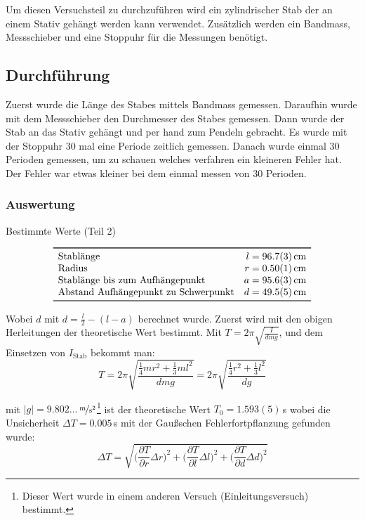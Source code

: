 \documentclass[11pt,a4paper]{article}
\newcommand{\pard}[2]{\frac{\partial #1}{\partial #2}}
\newcommand{\bigp}[1]{\bigg(#1\bigg)}
\begin{document}
Um diesen Versuchsteil zu durchzuführen wird ein zylindrischer Stab der an einem Stativ gehängt werden kann verwendet. Zusätzlich werden ein Bandmass, Messschieber und eine Stoppuhr für die Messungen benötigt. 



\FloatBarrier
\subsection{Durchführung}

Zuerst wurde die Länge des Stabes mittels Bandmass gemessen. Daraufhin wurde mit dem Messschieber den Durchmesser des Stabes gemessen. Dann wurde der Stab an das Stativ gehängt und per hand zum Pendeln gebracht. Es wurde mit der Stoppuhr 30 mal eine Periode zeitlich gemessen. Danach wurde einmal 30 Perioden gemessen, um zu schauen welches verfahren ein kleineren Fehler hat. Der Fehler war etwas kleiner bei dem einmal messen von 30 Perioden.

\subsubsection{Auswertung}

\begin{table}[ht]
\caption{Bestimmte Werte (Teil 2)}
$$
\begin{array}{lr}
	\toprule 
	\textrm{Stablänge} & l = 96.7(3)\,\textrm{cm} \\
	\textrm{Radius} & r = 0.50(1)\,\textrm{cm} \\
	\textrm{Stablänge bis zum Aufhängepunkt} & a = 95.6(3)\,\textrm{cm}\\
	\textrm{Abstand Aufhängepunkt zu Schwerpunkt} & d = 49.5(5)\,\textrm{cm}\\
	\bottomrule 
\end{array}
$$
\end{table}
Wobei $d$ mit $d = \frac{l}{2} - (l - a)$ berechnet wurde.
Zuerst wird mit den obigen Herleitungen der theoretische Wert bestimmt. Mit $T = 2\pi \sqrt{\frac{I}{dmg}}$, und dem Einsetzen von $I_{\textrm{Stab}}$ bekommt man:
$$T = 2\pi \sqrt{\frac{\frac{1}{4} m r^2 + \frac{1}{3} m l^2}{dmg}} = 2\pi \sqrt{\frac{\frac{1}{4} r^2 + \frac{1}{3} l^2}{dg}}$$

mit $|g|=9.802\dots$\,$\nicefrac{\textrm{m}}{\textrm{s}^2}$\footnote{Dieser Wert wurde in einem anderen Versuch (Einleitungsversuch) bestimmt.} ist der theoretische Wert $T_0 = 1.593(5)$\,s wobei die Unsicherheit $\Delta T = 0.005$\,s mit der Gaußschen Fehlerfortpflanzung gefunden wurde:
$$\Delta T = \sqrt{ \bigp{\pard{T}{r}\Delta r}^2 + \bigp{\pard{T}{l}\Delta l}^2 + \bigp{\pard{T}{d}\Delta d}^2 }$$
\end{document}
